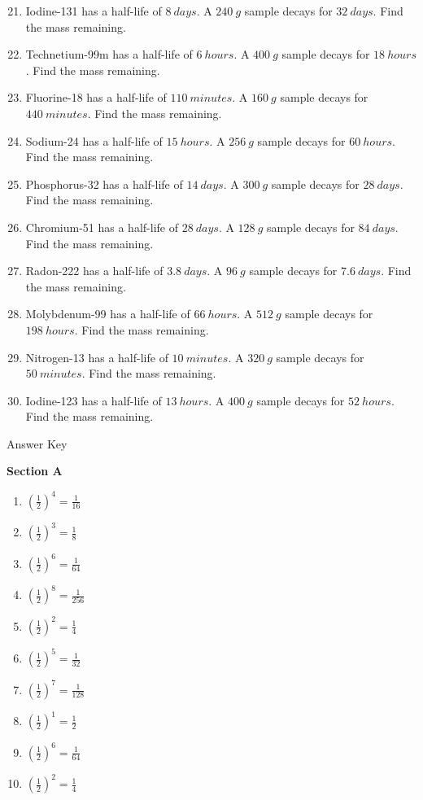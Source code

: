 \documentclass[12pt]{article}
\begin{document}
\begin{enumerate}
\setcounter{enumi}{20}
\item Iodine-131 has a half-life of \(\SI{8}{days}\). A \(\SI{240}{g}\) sample decays for \(\SI{32}{days}\). Find the mass remaining.
\item Technetium-99m has a half-life of \(\SI{6}{hours}\). A \(\SI{400}{g}\) sample decays for \(\SI{18}{hours}\). Find the mass remaining.
\item Fluorine-18 has a half-life of \(\SI{110}{minutes}\). A \(\SI{160}{g}\) sample decays for \(\SI{440}{minutes}\). Find the mass remaining.
\item Sodium-24 has a half-life of \(\SI{15}{hours}\). A \(\SI{256}{g}\) sample decays for \(\SI{60}{hours}\). Find the mass remaining.
\item Phosphorus-32 has a half-life of \(\SI{14}{days}\). A \(\SI{300}{g}\) sample decays for \(\SI{28}{days}\). Find the mass remaining.
\item Chromium-51 has a half-life of \(\SI{28}{days}\). A \(\SI{128}{g}\) sample decays for \(\SI{84}{days}\). Find the mass remaining.
\item Radon-222 has a half-life of \(\SI{3.8}{days}\). A \(\SI{96}{g}\) sample decays for \(\SI{7.6}{days}\). Find the mass remaining.
\item Molybdenum-99 has a half-life of \(\SI{66}{hours}\). A \(\SI{512}{g}\) sample decays for \(\SI{198}{hours}\). Find the mass remaining.
\item Nitrogen-13 has a half-life of \(\SI{10}{minutes}\). A \(\SI{320}{g}\) sample decays for \(\SI{50}{minutes}\). Find the mass remaining.
\item Iodine-123 has a half-life of \(\SI{13}{hours}\). A \(\SI{400}{g}\) sample decays for \(\SI{52}{hours}\). Find the mass remaining.
\end{enumerate}

\newpage
\begin{center}
{\LARGE Answer Key}
\end{center}

\textbf{Section A}
\begin{enumerate}
\item \(\left(\tfrac{1}{2}\right)^4=\tfrac{1}{16}\)
\item \(\left(\tfrac{1}{2}\right)^3=\tfrac{1}{8}\)
\item \(\left(\tfrac{1}{2}\right)^6=\tfrac{1}{64}\)
\item \(\left(\tfrac{1}{2}\right)^8=\tfrac{1}{256}\)
\item \(\left(\tfrac{1}{2}\right)^2=\tfrac{1}{4}\)
\item \(\left(\tfrac{1}{2}\right)^5=\tfrac{1}{32}\)
\item \(\left(\tfrac{1}{2}\right)^7=\tfrac{1}{128}\)
\item \(\left(\tfrac{1}{2}\right)^1=\tfrac{1}{2}\)
\item \(\left(\tfrac{1}{2}\right)^6=\tfrac{1}{64}\)
\item \(\left(\tfrac{1}{2}\right)^2=\tfrac{1}{4}\)
\end{enumerate}
\end{document}
